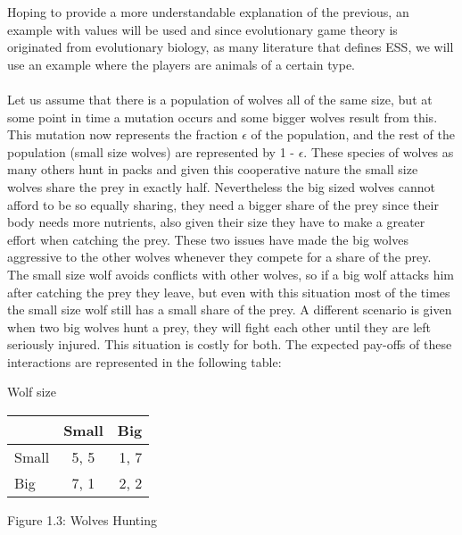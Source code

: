 \documentclass{article}
\begin{document}
Hoping to provide a more understandable explanation of the previous, an example with values will be used and since evolutionary game theory is originated from evolutionary biology, as many literature that defines ESS, we will use an example where the players are animals of a certain type.
\\\\Let us assume that there is a population of wolves all of the same size, but at some point in time a mutation occurs and some bigger wolves result from this. This mutation now represents the fraction $\epsilon$ of the population, and the rest of the population (small size wolves) are represented by 1 - $\epsilon$. These species of wolves as many others hunt in packs and given this cooperative nature the small size wolves share the prey in exactly half. Nevertheless the big sized wolves cannot afford to be so equally sharing, they need a bigger share of the prey since their body needs more nutrients, also given their size they have to make a greater effort when catching the prey. These two issues have made the big wolves aggressive to the other wolves whenever they compete for a share of the prey. The small size wolf avoids conflicts with other wolves, so if a big wolf attacks him after catching the prey they leave, but even with this situation most of the times the small size wolf still has a small share of the prey. A different scenario is given when two big wolves hunt a prey, they will fight each other until they are left seriously injured. This situation is costly for both. The expected pay-offs of these interactions are represented in the following table:
\begin{center}
Wolf size

\begin{tabular}{|l|c|r|}
\hline
 & Small & Big \\ 
\hline
Small & 5, 5 & 1, 7\\
\hline
 Big & 7, 1 & 2, 2\\
\hline
\end{tabular}
\end{center}
\begin{center}
	Figure 1.3: Wolves Hunting
\end{center}
\end{document}
